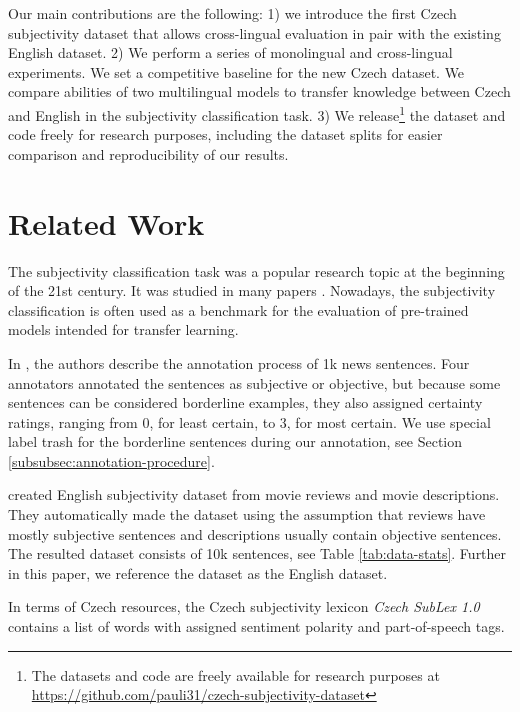 \documentclass[10pt, a4paper]{article}
\begin{document}
Our main contributions are the following: 1) we introduce the first Czech subjectivity dataset that allows cross-lingual evaluation in pair with the existing English dataset. 2) We perform a series of monolingual and cross-lingual experiments. We set a competitive baseline for the new Czech dataset. We compare abilities of two multilingual models to transfer knowledge between Czech and English in the subjectivity classification task. 3) We release\footnote{\label{foot:github}The datasets and code are freely available for research purposes at \url{https://github.com/pauli31/czech-subjectivity-dataset}} the dataset and code freely for research purposes, including the dataset splits for easier comparison and reproducibility of our results.

\section{Related Work}
\label{sec:related-work}

The subjectivity classification task was a popular research topic at the beginning of the 21st century. It was studied in many papers \cite{wiebe-wilson-2002-learning,wiebe2004learning,exploiting-2005-subjectivity,esuli-sebastiani-2006-determining,wiebe-mihalcea-2006-word,mihalcea-etal-2007-learning}. Nowadays, the subjectivity classification is often used as a benchmark for the evaluation of pre-trained models intended for transfer learning.

In \cite{wiebe-etal-1999-development}, the authors describe the annotation process of 1k news sentences. Four annotators annotated the sentences as subjective or objective, but because some sentences can be considered borderline examples, they also assigned certainty ratings, ranging from 0, for least certain, to 3, for most certain.  We use special label trash for the borderline sentences during our annotation, see Section \ref{subsubsec:annotation-procedure}.

\par {} created English subjectivity dataset from movie reviews and movie descriptions. They automatically made the dataset using the assumption that reviews have mostly subjective sentences and descriptions usually contain objective sentences. The resulted dataset consists of 10k sentences, see Table \ref{tab:data-stats}. Further in this paper, we reference the dataset as the English dataset.

\par In terms of Czech resources, the Czech subjectivity lexicon \textit{Czech SubLex 1.0} \cite{sublex} contains a list of words with assigned sentiment polarity and part-of-speech tags. 
\end{document}

